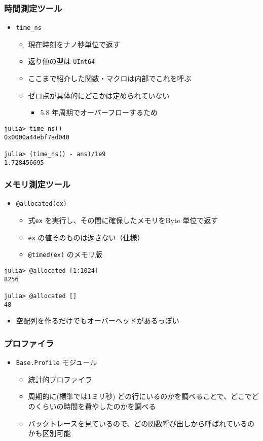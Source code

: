 \begin{frame}[containsverbatim]
  \frametitle{時間測定ツール}
  \begin{itemize}
    \item \verb|time_ns|
      \begin{itemize}
        \item 現在時刻をナノ秒単位で返す
        \item 返り値の型は \verb|UInt64|
        \item ここまで紹介した関数・マクロは内部でこれを呼ぶ
        \item ゼロ点が具体的にどこかは定められていない
          \begin{itemize}
            \item 5.8 年周期でオーバーフローするため
          \end{itemize}
      \end{itemize}
  \end{itemize}
  \begin{lstlisting}
julia> time_ns()
0x0000a44ebf7ad040

julia> (time_ns() - ans)/1e9
1.728456695
\end{lstlisting}
\end{frame}

\begin{frame}[containsverbatim]
\frametitle{メモリ測定ツール}
\begin{itemize}
  \item \verb|@allocated(ex)|
    \begin{itemize}
      \item 式\verb|ex| を実行し、その間に確保したメモリをByte 単位で返す
      \item \verb|ex| の値そのものは返さない（仕様）
      \item \verb|@timed(ex)| のメモリ版
    \end{itemize}
\end{itemize}
\begin{lstlisting}
julia> @allocated [1:1024]
8256

julia> @allocated []
48
\end{lstlisting}
\begin{itemize}
  \item 空配列を作るだけでもオーバーヘッドがあるっぽい
\end{itemize}
\end{frame}

\begin{frame}[containsverbatim]
\frametitle{プロファイラ}
\begin{itemize}
  \item \verb|Base.Profile| モジュール
    \begin{itemize}
      \item 統計的プロファイラ
      \item 周期的に(標準では1ミリ秒) どの行にいるのかを調べることで、どこでどのくらいの時間を費やしたのかを調べる
      \item バックトレースを見ているので、どの関数呼び出しから呼ばれているのかも区別可能
    \end{itemize}
\end{itemize}
\end{frame}


